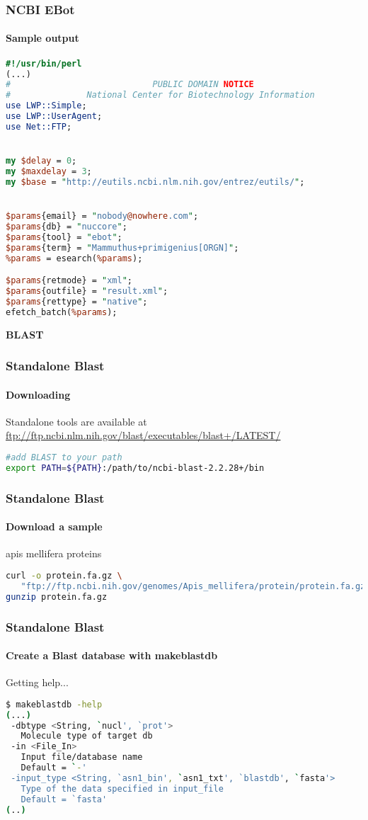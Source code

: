 \documentclass{beamer}
\newcommand{\centeredtitle}[1]{
\begin{center}
    \Huge{\bf{#1}}
\end{center}
}
\newcommand{\hugeslide}[1]{
\begin{frame}
\centeredtitle{#1}
\end{frame}
}
\begin{document}
\begin{frame}[fragile]
\frametitle{NCBI EBot}
\framesubtitle{Sample output}
\begin{lstlisting}[language=perl,basicstyle=\tiny,breaklines=true]
#!/usr/bin/perl 
(...)
#                            PUBLIC DOMAIN NOTICE
#               National Center for Biotechnology Information
use LWP::Simple;
use LWP::UserAgent;
use Net::FTP;


my $delay = 0;
my $maxdelay = 3;
my $base = "http://eutils.ncbi.nlm.nih.gov/entrez/eutils/";


$params{email} = "nobody@nowhere.com";
$params{db} = "nuccore";
$params{tool} = "ebot";
$params{term} = "Mammuthus+primigenius[ORGN]";
%params = esearch(%params);

$params{retmode} = "xml";
$params{outfile} = "result.xml";
$params{rettype} = "native";
efetch_batch(%params);
\end{lstlisting}
\end{frame}

\hugeslide{BLAST}

\begin{frame}[fragile]
\frametitle{Standalone Blast}
\framesubtitle{Downloading}
Standalone tools are available at \url{ftp://ftp.ncbi.nlm.nih.gov/blast/executables/blast+/LATEST/}
\begin{lstlisting}[language=bash]
#add BLAST to your path
export PATH=${PATH}:/path/to/ncbi-blast-2.2.28+/bin
\end{lstlisting}
\end{frame}


\begin{frame}[fragile]
\frametitle{Standalone Blast}
\framesubtitle{Download a sample}
apis mellifera proteins
\begin{lstlisting}[language=bash,basicstyle=\tiny,breaklines=true]
curl -o protein.fa.gz \
   "ftp://ftp.ncbi.nih.gov/genomes/Apis_mellifera/protein/protein.fa.gz"
gunzip protein.fa.gz
\end{lstlisting}
\end{frame}


\begin{frame}[fragile]
\frametitle{Standalone Blast}
\framesubtitle{Create a Blast database with makeblastdb}
Getting help...
\begin{lstlisting}[language=bash]
$ makeblastdb -help
(...)
 -dbtype <String, `nucl', `prot'>
   Molecule type of target db
 -in <File_In>
   Input file/database name
   Default = `-'
 -input_type <String, `asn1_bin', `asn1_txt', `blastdb', `fasta'>
   Type of the data specified in input_file
   Default = `fasta'
(..)
\end{lstlisting}
\end{frame}
\end{document}
